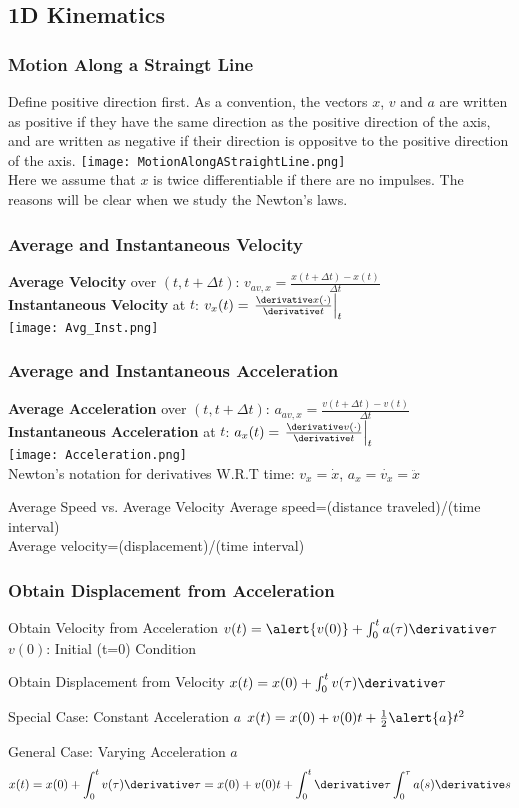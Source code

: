 \subsection{1D Kinematics}
\begin{frame}
\frametitle{Motion Along a Straingt Line}
Define \alert{positive direction} first. As a convention, the \alert{vectors} $x$, $v$ and $a$ are written as \alert{positive} if they have the \alert{same} direction as the \alert{positive} direction of the axis, and are written as \alert{negative} if their direction is \alert{oppositve} to the positive direction of the axis.
\texttt{[image: MotionAlongAStraightLine.png]}\\
Here we assume that $x$ is \alert{twice differentiable} if there are no impulses. The reasons will be clear when we study the Newton's laws.
\end{frame}
\begin{frame}
\frametitle{Average and Instantaneous Velocity}
\alert{\textbf{Average Velocity}} over $(t,t+\Delta t)$: $v_{av,x}=\frac{x(t+\Delta t)-x(t)}{\Delta t}$\\
\alert{\textbf{Instantaneous Velocity}} at $t$: $v_{x}(t)=\left.\frac{\derivative x(\cdot)}{\derivative t}\right|_{t}$\\
\texttt{[image: Avg\_Inst.png]}
\end{frame}
\begin{frame}
\frametitle{Average and Instantaneous Acceleration}
\alert{\textbf{Average Acceleration}} over $(t,t+\Delta t)$: $a_{av,x}=\frac{v(t+\Delta t)-v(t)}{\Delta t}$\\
\alert{\textbf{Instantaneous Acceleration}} at $t$: $a_{x}(t)=\left.\frac{\derivative v(\cdot)}{\derivative t}\right|_{t}$\\
\texttt{[image: Acceleration.png]}\\
Newton's notation for derivatives W.R.T time: $v_{x}=\dot{x}$, $a_{x}=\dot{v_{x}}=\ddot{x}$
\begin{block}{Average Speed vs. Average Velocity}
Average speed=(distance traveled)/(time interval)\\
Average velocity=(displacement)/(time interval)
\end{block}
\end{frame}
\begin{frame}
\frametitle{Obtain Displacement from Acceleration}
\begin{block}{Obtain Velocity from Acceleration}
$v(t)=\alert{v(0)}+\int_{0}^{t}a(\tau)\derivative\tau$ \quad $v(0)$: \alert{Initial (t=0) Condition}
\end{block}
\begin{block}{Obtain Displacement from Velocity}
$x(t)=x(0)+\int_{0}^{t}v(\tau)\derivative\tau$
\end{block}
\begin{block}{Special Case: Constant Acceleration $a$}
$x(t)=x(0)+v(0)t+\frac{1}{2}\alert{a}t^{2}$
\end{block}
\begin{block}{General Case: Varying Acceleration $a$}
\[x(t)=x(0)+\int_{0}^{t}v(\tau)\derivative\tau=x(0)+v(0)t+\int_{0}^{t}\derivative\tau\int_{0}^{\tau}a(s)\derivative s\]
\end{block}
\end{frame}
